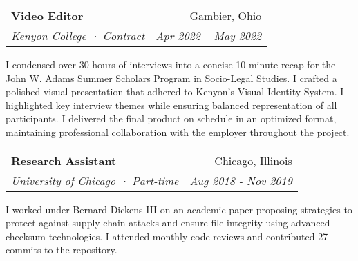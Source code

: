 \documentclass[letterpaper,10pt]{article}
\makeatletter
\newcommand{\resumeSubheading}[4]{
	\vspace{-2pt}\item
	\begin{tabular*}{0.97\textwidth}[t]{l@{\extracolsep{\fill}}r}
		\textbf{#1} & #2 \\
		\textit{\small#3} & \textit{\small #4} \\
	\end{tabular*}\vspace{-7pt}
}
\newcommand{\resumeParagraph}[1]{
	\item[]
	\parbox{\linewidth}{
		\small{#1\xspace} %
	}
	\vspace{-7pt}
}
\makeatother
\begin{document}
\resumeSubheading
{Video Editor}{Gambier, Ohio}
{Kenyon College · Contract}{Apr 2022 – May 2022}
\resumeParagraph{I condensed over 30 hours of interviews into a concise 10-minute recap for the John W. Adams Summer Scholars Program in Socio-Legal Studies. I crafted a polished visual presentation that adhered to Kenyon’s Visual Identity System. I highlighted key interview themes while ensuring balanced representation of all participants. I delivered the final product on schedule in an optimized format, maintaining professional collaboration with the employer throughout the project.}

\vspace{2pt}

\resumeSubheading
{Research Assistant}{Chicago, Illinois}
{University of Chicago · Part-time}{Aug 2018 - Nov 2019}
\resumeParagraph{I worked under Bernard Dickens III on an academic paper proposing strategies to protect against supply-chain attacks and ensure file integrity using advanced checksum technologies. I attended monthly code reviews and contributed 27 commits to the repository.}

\iffalse

\resumeSubheading
{Assistant General Contractor}{Chicago, Illinois}
{Sommerlad Construction · Part-time}{Jun 2023 – Aug 2023}
\resumeParagraph{I participated in demolition projects for remodeling efforts, performed general land management tasks such as lawn mowing and simple assembly, and supported the team in meeting deadlines and adhering to safety standards.}

\resumeSubheading
{Fontanos Subs}{Chicago, Illinois}
{Sub Artist · Part-time}{May 2021 – Aug 2021}
\resumeParagraph{Worked behind the counter making sandwiches, maintaining cleanliness, and ensuring efficient service. Assisted with troubleshooting online orders, ensuring customer satisfaction and smooth operations.}

\resumeSubheading
{Private Stock Studios}{Chicago, Illinois}
{Production Assistant}{Apr 2020 – Aug 2020}
\resumeParagraph{Streamlined film and music production processes, orchestrated schedules with studio professionals, and meticulously documented production details.}

\resumeSubheading
{Intercultural Montessori}{Chicago, Illinois}
{Teacher’s Aid}{Apr 2019 – Feb 2020}
\resumeParagraph{Tutored students, facilitated programming learning, provided teacher support, and ensured effective communication and punctuality.}


\fi
\end{document}
